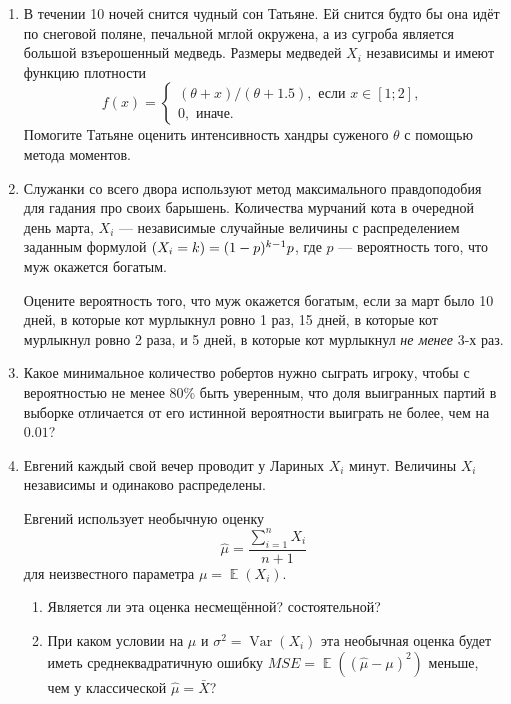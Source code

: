 \documentclass[12pt]{article} %
\DeclareMathOperator{\Var}{Var}
\DeclareMathOperator{\E}{\mathbb{E}}
\let\P\relax
\DeclareMathOperator{\P}{\mathbb{P}}
\begin{document}
\begin{enumerate}


\item В течении 10 ночей снится чудный сон Татьяне. Ей снится будто бы она идёт по снеговой поляне, 
печальной мглой окружена, а из сугроба является большой взъерошенный медведь. 
Размеры медведей $X_i$ независимы и имеют функцию плотности 
\[
f(x) = \begin{cases}    
(\theta + x)/(\theta + 1.5), \text{ если } x \in [1;2], \\
0,  \text{ иначе}.
\end{cases}
\]
Помогите Татьяне оценить интенсивность хандры суженого $\theta$ с помощью метода моментов. 

\item Служанки со всего двора используют метод максимального правдоподобия для 
гадания про своих барышень. 
Количества мурчаний кота в очередной день марта, $X_i$ —
независимые случайные величины с распределением заданным формулой $\P(X_i = k) = (1-p)^{k-1}p$,
где $p$ — вероятность того, что муж окажется богатым. 

Оцените вероятность того, что муж окажется богатым, если за март было 10 дней, 
в которые кот мурлыкнул ровно 1 раз, 15 дней, в которые кот мурлыкнул ровно 2 раза,
и 5 дней, в которые кот мурлыкнул \textit{не менее} 3-х раз. 

\item Какое минимальное количество робертов нужно сыграть игроку, чтобы 
с вероятностью не менее 80\% быть уверенным, что доля выигранных партий в выборке 
отличается от его истинной вероятности выиграть не более, чем на $0.01$?

\item Евгений каждый свой вечер проводит у Лариных $X_i$ минут. 
Величины $X_i$ независимы и одинаково распределены. 

Евгений использует необычную оценку 
\[
\hat\mu = \frac{\sum_{i=1}^n X_i}{n+1}
\]
для неизвестного параметра $\mu = \E(X_i)$. 

\begin{enumerate}
    \item Является ли эта оценка несмещённой? состоятельной?
    \item При каком условии на $\mu$ и $\sigma^2 = \Var(X_i)$ эта
    необычная оценка будет иметь среднеквадратичную ошибку $MSE = \E((\hat \mu - \mu)^2)$ меньше, чем у классической $\hat\mu=\bar X$?
\end{enumerate}




\end{enumerate}
\end{document}
